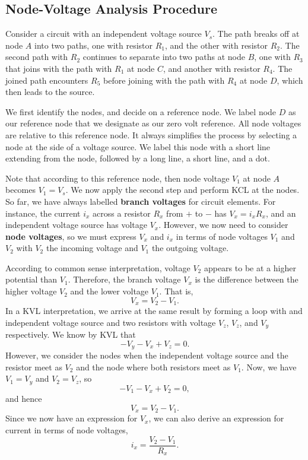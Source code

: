 \documentclass[11pt]{article}
\theoremstyle{plain} %
\theoremstyle{definition}
\theoremstyle{example}
\theoremstyle{remark}
\begin{document}
\subsection{Node-Voltage Analysis Procedure}
Consider a circuit with an independent voltage source $V_s$. The path breaks off at node $A$ into two paths, one with resistor $R_1$, and the other with resistor $R_2$. The second path with $R_2$ continues to separate into two paths at node $B$, one with $R_3$ that joins with the path with $R_1$ at node $C$, and another with resistor $R_4$. The joined path encounters $R_5$ before joining with the path with $R_4$ at node $D$, which then leads to the source. 

We first identify the nodes, and decide on a reference node. We label node $D$ as our reference node that we designate as our zero volt reference. All node voltages are relative to this reference node. It always simplifies the process by selecting a node at the side of a voltage source. We label this node with a short line extending from the node, followed by a long line, a short line, and a dot. 

Note that according to this reference node, then node voltage $V_1$ at node $A$ becomes $V_1 = V_s$. We now apply the second step and perform KCL at the nodes. So far, we have always labelled \textbf{branch voltages} for circuit elements. For instance, the current $i_x$ across a resistor $R_x$ from $+$ to $-$ has $V_x = i_xR_x$, and an independent voltage source has voltage $V_x$. However, we now need to consider \textbf{node voltages}, so we must express $V_x$ and $i_x$ in terms of node voltages $V_1$ and $V_2$ with $V_2$ the incoming voltage and $V_1$ the outgoing voltage. 

According to common sense interpretation, voltage $V_2$ appears to be at a higher potential than $V_1$. Therefore, the branch voltage $V_x$ is the difference between the higher voltage $V_2$ and the lower voltage $V_1$. That is, 
$$V_x = V_2 -V_1.$$
In a KVL interpretation, we arrive at the same result by forming a loop with and independent voltage source and two resistors with voltage $V_z$, $V_z$, and $V_y$ respectively. We know by KVL that 
$$-V_y-V_x+V_z=0.$$
However, we consider the nodes when the independent voltage source and the resistor meet as $V_2$ and the node where both resistors meet as $V_1$. Now, we have $V_1 = V_y$ and $V_2 = V_z$, so 
$$-V_1 -V_x+V_2=0,$$
and hence 
$$V_x = V_2-V_1.$$
Since we now have an expression for $V_x$, we can also derive an expression for current in terms of node voltages,
$$i_x = \frac{V_2-V_1}{R_x}.$$
\end{document}
